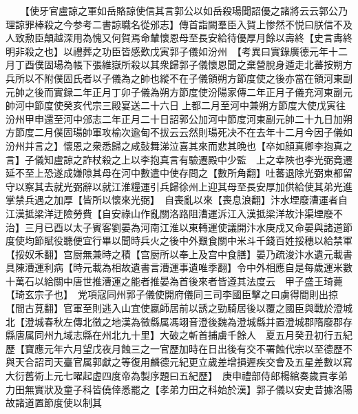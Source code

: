 　　【使牙官盧諒之軍如岳賂諒使信其言郭公以如岳殺瑒聞詔優之諸將云云郭公乃理諒罪棒殺之今参考二書諒職名從邠志】傳首詣闕羣臣入賀上惨然不悦曰朕信不及人致勲臣顛越深用為愧又何賀焉命輦懷恩母至長安給待優厚月餘以壽終【史言夀終明非殺之也】以禮葬之功臣皆感歎戊寅郭子儀如汾州　【考異曰實錄廣德元年十二月丁酉僕固瑒為帳下張維嶽所殺以其衆歸郭子儀懷恩聞之棄營脫身遁走北蕃按朔方兵所以不附僕固氏者以子儀為之帥也縱不在子儀領朔方節度使之後亦當在領河東副元帥之後而實録二年正月丁卯子儀為朔方節度使汾陽家傳二年正月子儀充河東副元帥河中節度使癸亥代宗三殿宴送二十六日上都二月至河中兼朔方節度大使戊寅往汾州甲申還至河中邠志二年正月二十日詔郭公加河中節度河東副元帥二十九日加朔方節度二月僕固瑒帥軍攻榆次逾甸不拔云云然則瑒死决不在去年十二月今因子儀如汾州并言之】懷恩之衆悉歸之咸鼔舞涕泣喜其來而悲其晩也【卒如顔真卿李抱真之言】子儀知盧諒之詐杖殺之上以李抱真言有驗遷殿中少監　上之幸陜也李光弼竟遷延不至上恐遂成嫌隙其母在河中數遣中使存問之【數所角翻】吐蕃退除光弼東都留守以察其去就光弼辭以就江淮糧運引兵歸徐州上迎其母至長安厚加供給使其弟光進掌禁兵遇之加厚【皆所以懷來光弼】　自喪亂以來【喪息浪翻】汴水堙廢漕運者自江漢抵梁洋迂險勞費【自安祿山作亂關洛路阻漕運泝江入漢抵梁洋故汴渠堙廢不治】三月已酉以太子賓客劉晏為河南江淮以東轉運使議開汴水庚戍又命晏與諸道節度使均節賦役聽便宜行畢以聞時兵火之後中外艱食關中米斗千錢百姓挼穗以給禁軍【挼奴禾翻】宫厨無兼時之積【宫厨所以奉上及宫中食膳】晏乃疏浚汴水遺元載書具陳漕運利病【時元載為相故遺書言漕運事遺唯季翻】令中外相應自是每歲運米數十萬石以給關中唐世推漕運之能者推晏為首後來者皆遵其法度云　甲子盛王琦薨【琦玄宗子也】　党項寇同州郭子儀使開府儀同三司李國臣擊之曰虜得間則出掠【間古莧翻】官軍至則逃入山宜使嬴師居前以誘之勁騎居後以覆之國臣與戰於澄城北【澄城春秋左傳北徵之地漢為徵縣属馮翊音澄後魏為澄城縣并置澄城郡隋廢郡存縣唐属同州九域志縣在州北九十里】大破之斬首捕虜千餘人　夏五月癸丑初行五紀歷【寶應元年六月望戊夜月蝕三之一官歷加時在日出後有交不署蝕代宗以至德歷不與天合詔司天臺官属郭獻之等復用麟德元紀更立歲差增損遲疾交會及五星差數以寫大衍舊術上元七曜起虚四度帝為製序題曰五紀歷】　庚申禮部侍郎楊綰奏歲貢孝弟力田無實狀及童子科皆僥倖悉罷之【孝弟力田之科始於漢】郭子儀以安史昔據洛陽故諸道置節度使以制其

